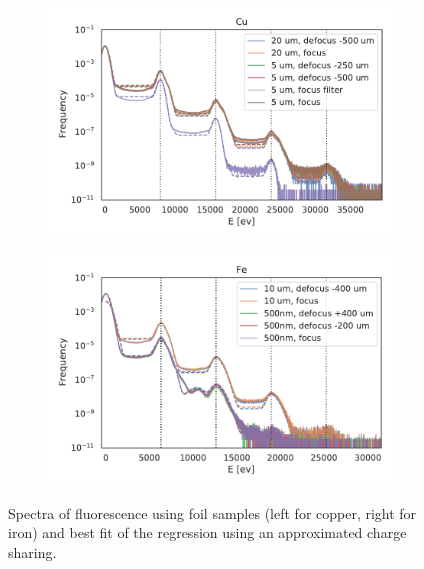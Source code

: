\begin{figure}[h!]
	\centering
	\begin{subfigure}[b]{0.45\textwidth}
		\includegraphics[width=\linewidth]{images/spectrum_foil_cu.pdf}
	\end{subfigure}
	\begin{subfigure}[b]{0.45\textwidth}
		\includegraphics[width=\linewidth]{images/spectrum_foil_fe.pdf}
	\end{subfigure}
	\caption[Spectra of fluorescence using foil samples ]{Spectra of fluorescence using foil samples (left for copper, right for iron) and best fit of the regression using an approximated charge sharing.}
	\label{fig:spectrafoil}
\end{figure}

